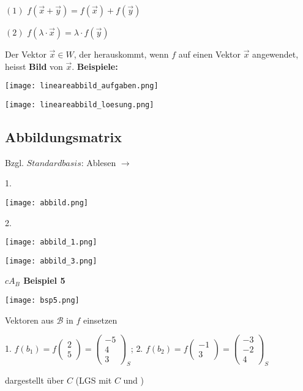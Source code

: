 \begin{multicols*}{3}
    {$(1)$ $f(\vec{x}+\vec{y})=f(\vec{x}) + f(\vec{y})$}

    {$(2)$ $f(\lambda \cdot \vec{x})=\lambda \cdot f(\vec{y})$}
    \WhiteSpace

    {Der Vektor $\vec{x} \in W$, der herauskommt, wenn $f$ auf einen Vektor $\vec{x}$ angewendet, heisst \textbf{Bild} von $\vec{x}$.}
    \WhiteSpace
    {\textbf{Beispiele:}}

    {\texttt{[image: lineareabbild\_aufgaben.png]}}

    {\texttt{[image: lineareabbild\_loesung.png]}}
    \vfill\null
    \columnbreak
    \subsection{Abbildungsmatrix}
    {Bzgl. $Standardbasis$: Ablesen $\to$}

    {1.}

    {\texttt{[image: abbild.png]}}

    {2.}

    {\texttt{[image: abbild\_1.png]}}

    {\texttt{[image: abbild\_3.png]}}

    {\textbf{$cA_B$ Beispiel 5} }

    {\texttt{[image: bsp5.png]}}

    { Vektoren aus $\mathcal{B} $ in $f$ einsetzen}

    {1. $ f(b_1) = f(\begin{matrix}
                2 \\
                5
            \end{matrix}) = \begin{pmatrix}
                -5 \\
                4  \\
                3
            \end{pmatrix}_S$; }{ 2. $ f(b_2) = f(\begin{matrix}
                -1 \\
                3
            \end{matrix}) = \begin{pmatrix}
                -3 \\
                -2 \\
                4
            \end{pmatrix}_S$}

    { dargestellt über $C$ (LGS mit $C$ und )}



\end{multicols*}
